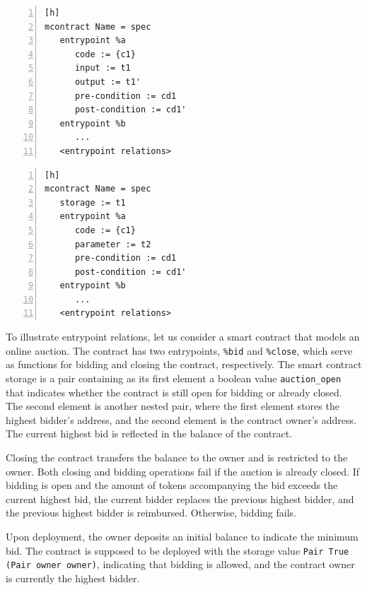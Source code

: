 \documentclass[a4paper,USenglish,cleveref, autoref, thm-restate]{lipics-v2021}
\begin{document}
\begin{lstlisting}[float,captionpos=b,caption={Multiple entrypoint specification syntax (option 1)},label={lst:multiple-entrypoint-specification-1},numbers=left][h]
mcontract Name = spec
   entrypoint %a 
      code := {c1}
      input := t1
      output := t1'
      pre-condition := cd1
      post-condition := cd1'
   entrypoint %b 
      ...
   <entrypoint relations>
\end{lstlisting}

\begin{lstlisting}[float,captionpos=b,caption={Multiple entrypoint specification syntax (option 2)},label={lst:multiple-entrypoint-specification-2},numbers=left][h]
mcontract Name = spec
   storage := t1
   entrypoint %a 
      code := {c1}
      parameter := t2
      pre-condition := cd1
      post-condition := cd1'
   entrypoint %b 
      ...
   <entrypoint relations>
\end{lstlisting}

To illustrate entrypoint relations, let us consider a smart contract
that models an online auction. The contract has two entrypoints,
\lstinline|%bid| and \lstinline|%close|, which serve as functions for
bidding and closing the contract, respectively.  The smart contract
storage is a pair containing as its first element a boolean value
\lstinline|auction_open| that indicates whether the contract is still
open for bidding or already closed. The second element is another
nested pair, where the first element stores the highest bidder's
address, and the second element is the contract owner's address. The
current highest bid is reflected in the balance of the contract. 

Closing the contract transfers the balance to the owner and is
restricted to the owner. Both closing and bidding operations fail if
the auction is already closed. If bidding is open and the amount of
tokens accompanying the bid exceeds the current highest bid, the
current bidder replaces the previous highest bidder, and the previous
highest bidder is reimbursed. Otherwise, bidding fails. 

Upon deployment, the owner deposits an initial balance to indicate the minimum bid. The contract is supposed to be deployed with the storage value  \lstinline/Pair True (Pair owner owner)/, indicating that bidding is allowed, and the contract owner is currently the highest bidder.
\end{document}
